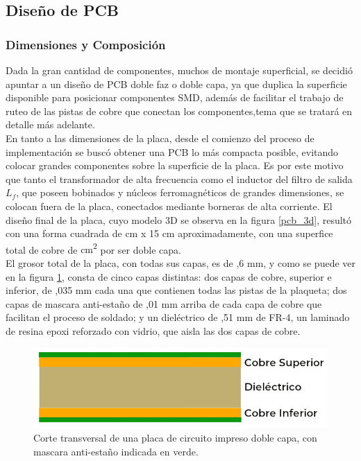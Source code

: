 \subsection{Diseño de PCB}

\subsubsection{Dimensiones y Composición}

Dada la gran cantidad de componentes, muchos de montaje superficial, se decidió apuntar a un diseño de PCB {\Medium doble faz o doble capa}, ya que duplica la superficie disponible para posicionar componentes SMD, además de facilitar el trabajo de ruteo de las pistas de cobre que conectan los componentes,tema que se tratará en detalle más adelante.\\

En tanto a las dimensiones de la placa, desde el comienzo del proceso de implementación se buscó obtener una PCB lo más compacta posible, evitando colocar grandes componentes sobre la superficie de la placa. Es por este motivo que tanto el transformador de alta frecuencia como el inductor del filtro de salida $L_f$, que poseen bobinados y núcleos ferromagnéticos de grandes dimensiones, se colocan fuera de la placa, conectados mediante borneras de alta corriente. El diseño final de la placa, cuyo modelo 3D se observa en la figura \ref{pcb_3d}, resultó con una forma cuadrada de { cm x 15 cm} aproximadamente, con una superfice total de cobre de { cm\textsuperscript{2}} por ser doble capa.\\

El grosor total de la placa, con todas sus capas, es de {,6 mm}, y como se puede ver en la figura \ref{doble_capa}, consta de cinco capas distintas: dos capas de cobre, superior e inferior, de {,035 mm} cada una que contienen todas las pistas de la plaqueta; dos capas de mascara anti-estaño de {,01 mm} arriba de cada capa de cobre que facilitan el proceso de soldado; y un dieléctrico de {,51 mm de FR-4}, un laminado de resina epoxi reforzado con vidrio, que aisla las dos capas de cobre.\\

\begin{figure}[h]
    \centering
    \includegraphics[scale=0.4]{Imagenes/Perfil Doble Capa.png}
    \caption{Corte transversal de una placa de circuito impreso doble capa, con mascara anti-estaño indicada en verde.}
    \label{doble_capa}
\end{figure}

